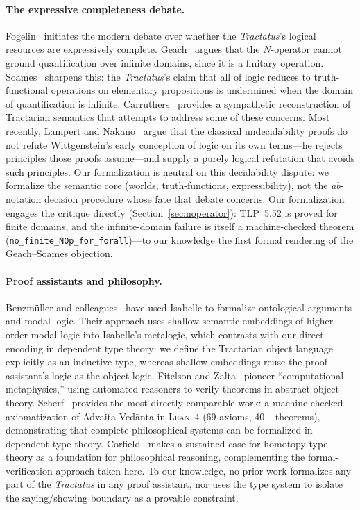 \documentclass[10pt, letterpaper]{article}
\theoremstyle{definition}
\theoremstyle{remark}
\newcommand{\Lean}{\textsc{Lean}}
\begin{document}
\paragraph{The expressive completeness debate.}
Fogelin~\cite{fogelin1987} initiates the modern debate over
whether the \emph{Tractatus}'s logical resources are
expressively complete.  Geach~\cite{geach1981} argues that the
$N$-operator cannot ground quantification over infinite domains,
since it is a finitary operation.
Soames~\cite{soames1983} sharpens this: the \emph{Tractatus}'s
claim that all of logic reduces to truth-functional operations
on elementary propositions is undermined when the domain of
quantification is infinite.
Carruthers~\cite{carruthers1989} provides a sympathetic
reconstruction of Tractarian semantics that attempts to address
some of these concerns.
Most recently, Lampert and Nakano~\cite{lampert2025} argue that
the classical undecidability proofs do not refute Wittgenstein's
early conception of logic on its own terms---he rejects
principles those proofs assume---and supply a purely logical
refutation that avoids such principles.  Our formalization is
neutral on this decidability dispute: we formalize the semantic
core (worlds, truth-functions, expressibility), not the
\emph{ab}-notation decision procedure whose fate that debate
concerns.
Our formalization engages the critique directly
(Section~\ref{sec:noperator}): TLP~5.52 is proved for finite
domains, and the infinite-domain failure is itself a
machine-checked theorem
(\texttt{no\_finite\_NOp\_for\_forall})---to our knowledge the
first formal rendering of the Geach--Soames objection.

\paragraph{Proof assistants and philosophy.}
Benzm\"uller and colleagues~\cite{benzmuller2017} have used
Isabelle to formalize ontological arguments and modal logic.
Their approach uses shallow semantic embeddings of higher-order
modal logic into Isabelle's metalogic, which contrasts with our
direct encoding in dependent type theory: we define the
Tractarian object language explicitly as an inductive type,
whereas shallow embeddings reuse the proof assistant's logic
as the object logic.
Fitelson and Zalta~\cite{fitelson2007} pioneer ``computational
metaphysics,'' using automated reasoners to verify theorems
in abstract-object theory.
Scherf~\cite{scherf2025} provides the most directly comparable
work: a machine-checked axiomatization of Advaita Ved\=anta in
\Lean~4 (69 axioms, 40+ theorems), demonstrating that complete
philosophical systems can be formalized in dependent type
theory.
Corfield~\cite{corfield2020} makes a sustained case for
homotopy type theory as a foundation for philosophical
reasoning, complementing the formal-verification approach
taken here.
To our knowledge, no prior work formalizes any part of the
\emph{Tractatus} in any proof assistant, nor uses the type
system to isolate the saying/showing boundary as a provable
constraint.
\end{document}
